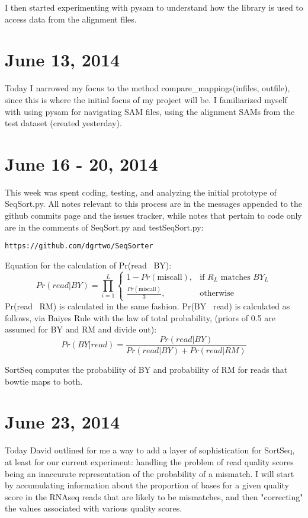 \documentclass[11pt]{article}
\begin{document}
I then started experimenting with pysam to understand how the library is used to access data from the alignment files.
\section*{June 13, 2014}
Today I narrowed my focus to the method compare\_mappings(infiles, outfile), since this is where the initial focus of my project will be. I familiarized myself with using pysam for navigating SAM files, using the alignment SAMs from the test dataset (created yesterday).

\section*{June 16 - 20, 2014}
This week was spent coding, testing, and analyzing the initial prototype of SeqSort.py. All notes relevant to this process are in the messages appended to the github commits page and the issues tracker, while notes that pertain to code only are in the comments of SeqSort.py and testSeqSort.py:

\begin{verbatim}
https://github.com/dgrtwo/SeqSorter
\end{verbatim}
\noindent
Equation for the calculation of Pr(read \textbar\ BY):
\begin{equation*}
Pr(read | BY) = \prod_{i=1}^{L}\begin{cases}
    1 - Pr(\text{miscall}), & \text{if }R_{L}\text{ matches } BY_{L}\\
    \frac{Pr(\text{miscall})}{3}, & \text{otherwise}
  \end{cases}
\end{equation*}
\smallskip
Pr(read \textbar\ RM) is calculated in the same fashion. Pr(BY \textbar\ read) is calculated as follows, via Baiyes Rule with the law of total probability, (priors of 0.5 are assumed for BY and RM and divide out):
\begin{equation*}
  Pr(BY | read) = \frac{Pr(read | BY)}{Pr(read | BY) + Pr(read | RM)}
\end{equation*}

SortSeq computes the probability of BY and probability of RM for reads that bowtie maps to both. 

\section*{June 23, 2014}
Today David outlined for me a way to add a layer of sophistication for SortSeq, at least for our current experiment: handling the problem of read quality scores being an inaccurate representation of the probability of a mismatch. I will start by accumulating information about the proportion of bases for a given quality score in the RNAseq reads that are likely to be mismatches, and then "correcting" the values associated with various quality scores.
\end{document}
